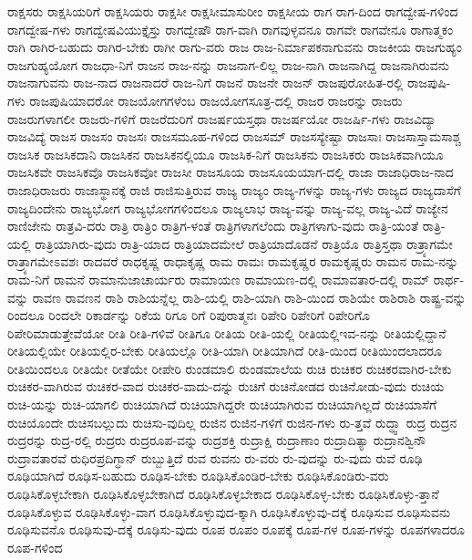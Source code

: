 {ರಾಕ್ಷಸರು
ರಾಕ್ಷಸಿಯರಿಗೆ
ರಾಕ್ಷಸಿಯರು
ರಾಕ್ಷಸೀ
ರಾಕ್ಷಸೀಮಾಸುರೀಂ
ರಾಕ್ಷಸೀಯ
ರಾಗ
ರಾಗ-ದಿಂದ
ರಾಗದ್ವೇಷ-ಗಳಿಂದ
ರಾಗದ್ವೇಷ-ಗಳು
ರಾಗದ್ವೇಷವಿಯುಕ್ತೈಸ್ತು
ರಾಗದ್ವೇಷೌ
ರಾಗ-ವಾಗಿ
ರಾಗವುಳ್ಳವನೂ
ರಾಗವೇ
ರಾಗವೇನೂ
ರಾಗಾತ್ಮಕಂ
ರಾಗಿ
ರಾಗಿರ-ಬಹುದು
ರಾಗಿರ-ಬೇಕು
ರಾಗೀ
ರಾಗು-ವರು
ರಾಜ
ರಾಜ-ನಿರ್ಮಾಪಕನಾಗುವನು
ರಾಜಕೀಯ
ರಾಜಗುಹ್ಯಂ
ರಾಜಗುಹ್ಯಯೋಗ
ರಾಜಧಾ-ನಿಗೆ
ರಾಜನ
ರಾಜ-ನನ್ನು
ರಾಜನಾಗ-ಲಿಲ್ಲ
ರಾಜ-ನಾಗಿ
ರಾಜನಾಗಿದ್ದ
ರಾಜನಾಗಿರುವನು
ರಾಜನಾಗುವನು
ರಾಜ-ನಾದ
ರಾಜನಾದರೆ
ರಾಜ-ನಿಗೆ
ರಾಜನೆ
ರಾಜನೇ
ರಾಜನ್
ರಾಜಪುರೋಹಿತ-ರಲ್ಲಿ
ರಾಜಪುಷಿ-ಗಳು
ರಾಜಪುಷಿಯಾದರೋ
ರಾಜಯೋಗಗಳೆಂಬ
ರಾಜಯೋಗಸೂತ್ರ-ದಲ್ಲಿ
ರಾಜರ
ರಾಜರನ್ನು
ರಾಜರು
ರಾಜರುಗಳಾಗಲೀ
ರಾಜರು-ಗಳಿಗೆ
ರಾಜರೆದುರಿಗೆ
ರಾಜರ್ಷಯಸ್ತಥಾ
ರಾಜರ್ಷಯೋ
ರಾಜರ್ಷಿ-ಗಳು
ರಾಜವಿದ್ಯಾ
ರಾಜವಿದ್ಯೆ
ರಾಜಸ
ರಾಜಸಂ
ರಾಜಸಃ
ರಾಜಸಮೂಹ-ಗಳಿಂದ
ರಾಜಸಮ್
ರಾಜಸಸ್ಯೇಷ್ಟಾ
ರಾಜಸಾಃ
ರಾಜಸಾಸ್ತಾಮಸಾಶ್ಚ
ರಾಜಸಿಕ
ರಾಜಸಿಕದಾನಿ
ರಾಜಸಿಕನ
ರಾಜಸಿಕನಲ್ಲಿಯೂ
ರಾಜಸಿಕ-ನಿಗೆ
ರಾಜಸಿಕನು
ರಾಜಸಿಕರು
ರಾಜಸಿಕವಾಗಿಯೂ
ರಾಜಸಿಕವೇ
ರಾಜಸಿಕವೊ
ರಾಜಸಿಕವೋ
ರಾಜಸೀ
ರಾಜಸೂಯ
ರಾಜಸೂಯಯಾಗ-ದಲ್ಲಿ
ರಾಜಾ
ರಾಜಾಧಿರಾಜ-ನಾದ
ರಾಜಾಧಿರಾಜರು
ರಾಜಾಸ್ಥಾನಕ್ಕೆ
ರಾಜಿ
ರಾಜಿಸುತ್ತಿರುವ
ರಾಜ್ಯ
ರಾಜ್ಯಂ
ರಾಜ್ಯ-ಗಳನ್ನು
ರಾಜ್ಯ-ಗಳು
ರಾಜ್ಯದ
ರಾಜ್ಯದಾಸೆಗೆ
ರಾಜ್ಯದಿಂದೇನು
ರಾಜ್ಯಭೋಗ
ರಾಜ್ಯಭೋಗಗಳಿಂದಲೂ
ರಾಜ್ಯಲಾಭ
ರಾಜ್ಯ-ವನ್ನು
ರಾಜ್ಯ-ವಲ್ಲ
ರಾಜ್ಯ-ವಿದೆ
ರಾಜ್ಯೇನ
ರಾಣಿಜೇನು
ರಾತ್ರವಿ-ದರು
ರಾತ್ರಿ
ರಾತ್ರಿಂ
ರಾತ್ರಿಗ-ಳಂತೆ
ರಾತ್ರಿಗಳಾಗಲೆಂದು
ರಾತ್ರಿಗಳಾಗು-ವುದು
ರಾತ್ರಿ-ಯಂತೆ
ರಾತ್ರಿ-ಯಲ್ಲಿ
ರಾತ್ರಿಯಾಗಿರು-ವುದು
ರಾತ್ರಿ-ಯಾದ
ರಾತ್ರಿಯಾದಮೇಲೆ
ರಾತ್ರಿಯಾದೊಡನೆ
ರಾತ್ರಿಯೊ
ರಾತ್ರಿಸ್ತಥಾ
ರಾತ್ರ್ಯಾಗಮೇ
ರಾತ್ರ್ಯಾಗಮೇಽವಶಃ
ರಾದವರೆ
ರಾಧಕೃಷ್ಣ
ರಾಧಾಕೃಷ್ಣ
ರಾಮ
ರಾಮಃ
ರಾಮಕೃಷ್ಣರ
ರಾಮಕೃಷ್ಣರು
ರಾಮನ
ರಾಮ-ನನ್ನು
ರಾಮ-ನಿಗೆ
ರಾಮನೆ
ರಾಮಾನುಜಾಚಾರ್ಯರು
ರಾಮಾಯಣ
ರಾಮಾಯಣ-ದಲ್ಲಿ
ರಾಮಾವತಾರ-ದಲ್ಲಿ
ರಾಮ್
ರಾರ್ಥ-ವನ್ನು
ರಾವಣ
ರಾವಣನ
ರಾಶಿ
ರಾಶಿಯನ್ನೆಲ್ಲ
ರಾಶಿ-ಯಲ್ಲಿ
ರಾಶಿ-ಯಾಗಿ
ರಾಶಿ-ಯಿಂದ
ರಾಶಿಯೇ
ರಾಶಿರಾಶಿ
ರಾಷ್ಟ್ರ-ವನ್ನು
ರಿಂದಲೂ
ರಿಂದಲೇ
ರಿಕಾರ್ಡನ್ನು
ರಿಕೆಯ
ರಿಗೂ
ರಿಗೆ
ರಿಪುರಾತ್ಮನಃ
ರಿಪೇರಿ
ರಿಪೇರಿಗೆ
ರಿಪೇರಿಗೊ
ರಿಪೇರಿಮಾಡುತ್ತೇವೆಯೋ
ರೀತಿ
ರೀತಿ-ಗಳಿವೆ
ರೀತಿಗೂ
ರೀತಿಯ
ರೀತಿ-ಯಲ್ಲಿ
ರೀತಿಯಲ್ಲಿಇವ-ನನ್ನು
ರೀತಿಯಲ್ಲಿದ್ದಾನೆ
ರೀತಿಯಲ್ಲಿಯೇ
ರೀತಿಯಲ್ಲಿರ-ಬೇಕು
ರೀತಿಯಲ್ಲೊ
ರೀತಿ-ಯಾಗಿ
ರೀತಿಯಾಗಿದೆ
ರೀತಿ-ಯಿಂದ
ರೀತಿಯಿಂದಲಾದರೂ
ರೀತಿಯಿಂದಲೂ
ರೀತಿಯೇ
ರೀತೆಯೇ
ರೀಪೇರಿ
ರುಂಡಮಾಲಿ
ರುಂಡಮಾಲೆಯ
ರುಚಿ
ರುಚಿಕರ
ರುಚಿಕರವಾಗಿರ-ಬೇಕು
ರುಚಿಕರ-ವಾಗಿರುವ
ರುಚಿಕರ-ವಾದ
ರುಚಿಕರ-ವಾದು-ದನ್ನು
ರುಚಿಗೆ
ರುಚಿನೋಡದ
ರುಚಿನೋಡು-ವುದು
ರುಚಿಯ
ರುಚಿ-ಯನ್ನು
ರುಚಿ-ಯಾಗಲಿ
ರುಚಿಯಾಗಿದೆ
ರುಚಿಯಾಗಿದ್ದರೇ
ರುಚಿಯಾಗಿರುವ
ರುಚಿಯಾಗಿಲ್ಲದೆ
ರುಚಿಯಾಸೆಗೆ
ರುಚಿಯೊಂದೇ
ರುಚಿಸಬಲ್ಲುದು
ರುಚಿಸು-ವುದಿಲ್ಲ
ರುಜಿನ
ರುಜಿನ-ಗಳಿಗೆ
ರುಜಿನ-ಗಳು
ರು-ತ್ತವೆ
ರುದ್ಧ್ವಾ
ರುದ್ರ
ರುದ್ರನ
ರುದ್ರರನ್ನು
ರುದ್ರ-ರಲ್ಲಿ
ರುದ್ರರು
ರುದ್ರರೂಪ-ವನ್ನು
ರುದ್ರಶಕ್ತಿ
ರುದ್ರಾಕ್ಷಿ
ರುದ್ರಾಣಾಂ
ರುದ್ರಾದಿತ್ಯಾ
ರುದ್ರಾನಶ್ವಿನೌ
ರುದ್ರಾವತಾರವೆ
ರುಧಿರಪ್ರದಿಗ್ಧಾನ್
ರುಬ್ಬುತ್ತಿದೆ
ರುವ
ರುವನು
ರು-ವರು
ರು-ವುದನ್ನು
ರು-ವುದು
ರುವೆ
ರೂಢಿ
ರೂಢಿಯಾಗಿದೆ
ರೂಢಿಸ-ಬಹುದು
ರೂಢಿಸ-ಬೇಕು
ರೂಢಿಸಿಕೊಂಡಿರ-ಬೇಕು
ರೂಢಿಸಿಕೊಂಡಿರು-ವರು
ರೂಢಿಸಿಕೊಳ್ಳಬೇಕಾಗಿ
ರೂಢಿಸಿಕೊಳ್ಳಬೇಕಾಗಿದೆ
ರೂಢಿಸಿಕೊಳ್ಳಬೇಕಾದ
ರೂಢಿಸಿಕೊಳ್ಳ-ಬೇಕು
ರೂಢಿಸಿಕೊಳ್ಳು-ತ್ತಾನೆ
ರೂಢಿಸಿಕೊಳ್ಳುವ
ರೂಢಿಸಿಕೊಳ್ಳು-ವಾಗ
ರೂಢಿಸಿಕೊಳ್ಳುವುದ-ಕ್ಕಾಗಿ
ರೂಢಿಸಿಕೊಳ್ಳುವು-ದಕ್ಕೆ
ರೂಢಿಸುವ
ರೂಢಿಸುವನು
ರೂಢಿಸುವನೊ
ರೂಢಿಸುವು-ದಕ್ಕೆ
ರೂಢಿಸು-ವುದು
ರೂಪ
ರೂಪಂ
ರೂಪಕ್ಕೆ
ರೂಪ-ಗಳ
ರೂಪ-ಗಳನ್ನು
ರೂಪಗಳಾದರೂ
ರೂಪ-ಗಳಿಂದ
}

